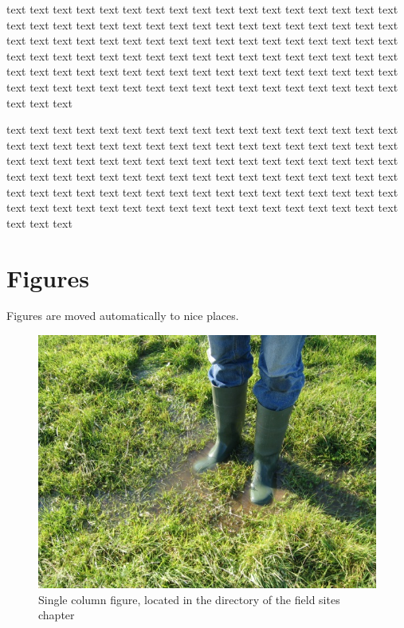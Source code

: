 \documentclass[twocolumn, 10pt, a4paper]{memoir}
\begin{document}
text text text text text text text text text text text text text text text text text text text text text
text text text text text text text text text text text text text text text text text text text text text
text text text text text text text text text text text text text text text text text text text text text
text text text text text text text text text text text text text text text text text text text text text
text text text text text text text text text text text text text text text text text text text text text

text text text text text text text text text text text text text text text text text text text text text
text text text text text text text text text text text text text text text text text text text text text
text text text text text text text text text text text text text text text text text text text text text
text text text text text text text text text text text text text text text text text text text text text
text text text text text text text text text text text text text text text text text text text text text

\section{Figures}

Figures are moved automatically to nice places.

\begin{figure}[t]
\center
\includegraphics[width=\columnwidth]{figs/ponds.jpg}
\caption{Single column figure, located in the directory of the field sites chapter}
\label{fig: ponds}
\end{figure}
\end{document}
